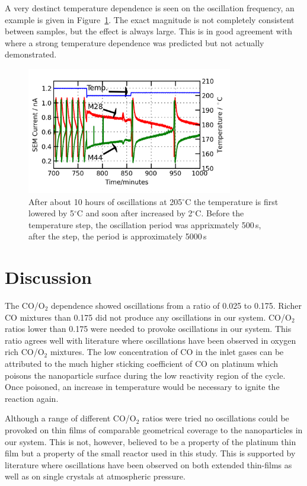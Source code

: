 \documentclass[8.5pt,twoside,twocolumn]{article}
\begin{document}
A very destinct temperature dependence is seen on the oscillation frequency, an example is given in Figure~\ref{fgr:temperature_dependence}. The exact magnitude is not completely consistent between samples, but the effect is always large. This is in good agreement with \cite{Hendriksen2010} where a strong temperature dependence was predicted but not actually demonstrated.
\begin{figure}[h]
\centering
  \includegraphics[width=9cm]{temperature_dependence.png}
  \caption{After about 10 hours of oscillations at 205$^\circ$C the temperature is first lowered by 5$^\circ$C and soon after increased by 2$^\circ$C. Before the temperature step, the oscillation period was apprixmately 500\,s, after the step, the period is approximately 5000\,s}
  \label{fgr:temperature_dependence}
\end{figure}


\section{Discussion}
The CO/O$_2$ dependence showed oscillations from a ratio of 0.025 to 0.175. Richer CO mixtures than 0.175 did not produce any oscillations in our system. CO/O$_2$ ratios lower than 0.175 were needed to provoke oscillations in our system. This ratio agrees well with literature \cite{Singh2010,Hendriksen2005} where oscillations have been observed in oxygen rich CO/O$_2$ mixtures. The low concentration of CO in the inlet gases can be attributed to the much higher sticking coefficient of CO on platinum which poisons the nanoparticle surface during the low reactivity region of the cycle. Once poisoned, an increase in temperature would be necessary to ignite the reaction again.

Although a range of different CO/O$_2$ ratios were tried no oscillations could be provoked on thin films of comparable geometrical coverage to the nanoparticles in our system. This is not, however, believed to be a property of the platinum thin film but a property of the small reactor used in this study. This is supported by literature where oscillations have been observed on both extended thin-films \cite{Singh2010} as well as on single crystals \cite{Hendriksen2005} at atmospheric pressure.
\end{document}
